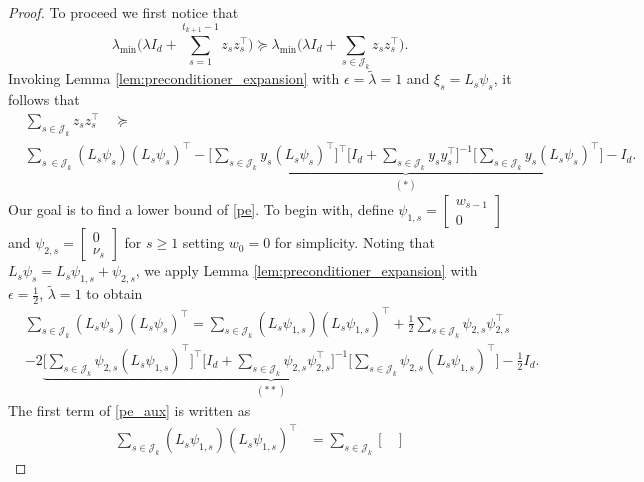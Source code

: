 \documentclass[11pt]{article}
\theoremstyle{plain}
\theoremstyle{definition}
\theoremstyle{remark}
\begin{document}
\begin{proof}
To proceed we first notice that
\[
{\lambda_{\min}} \bigg(\lambda I_d+ \sum_{s=1}^{t_{k+1}-1} z_s z_s^\top\bigg) \succeq    {\lambda_{\min}} \bigg(\lambda I_d+\sum_{s \in\mathcal{J}_k} z_s z_s^\top\bigg).
\]
Invoking Lemma \ref{lem:preconditioner_expansion} with $\epsilon=\tilde\lambda=1$ and $\xi_s=L_s \psi_s$, it follows that
\begin{equation}\label{pe}
\begin{split}
&\sum_{s \in\mathcal{J}_k} z_s z_s^{\top}\quad\succeq\\
& \sum_{s\ \in\mathcal{J}_k}  (L_s\psi_s)(L_s\psi_s)^{\top} - \underbrace{\bigg[\sum_{s \in\mathcal{J}_k}  y_s (L_s \psi_s)^{\top}\bigg]^{\top}\bigg [ I_d+\sum_{s \in\mathcal{J}_k} y_sy_s^{\top}\bigg ]^{-1} \bigg [\sum_{s \in\mathcal{J}_k}  y_s (L_s \psi_s)^{\top}\bigg ]}_{(*)} -  I_d.
\end{split}
\end{equation}
Our goal is to find a lower bound of \eqref{pe}. To begin with, define $
\psi_{1,s} = 
\begin{bmatrix}
    w_{s-1}\\
    0
\end{bmatrix}$ and $
\psi_{2,s} = 
\begin{bmatrix}
    0\\
    \nu_{s}
\end{bmatrix}$ for $s\geq 1$ setting $w_0=0$ for simplicity. Noting that $L_s\psi_s = L_s\psi_{1,s} + \psi_{2,s}$, we apply Lemma \ref{lem:preconditioner_expansion} with $\epsilon=\frac{1}{2}$, $\tilde\lambda=1$ to obtain
\begin{equation}\label{pe_aux}
\begin{split}
    &\sum_{s \in\mathcal{J}_k}  (L_s\psi_{s})(L_s\psi_{s})^{\top}
    =\sum_{s \in\mathcal{J}_k}  (L_s\psi_{1,s})(L_s\psi_{1,s})^{\top} + \frac{1}{2}\sum_{s \in\mathcal{J}_k} \psi_{2,s}\psi_{2,s}^{\top}\\
    & - 2\underbrace{\bigg [\sum_{s \in\mathcal{J}_k}  \psi_{2,s} (L_s \psi_{1,s})^{\top}\bigg]^{\top}\bigg[ I_d+\sum_{s \in\mathcal{J}_k} \psi_{2,s}\psi_{2,s}^{\top}\bigg]^{-1}\bigg[\sum_{s \in\mathcal{J}_k}  \psi_{2,s} (L_s \psi_{1,s})^{\top}\bigg]}_{(**)} - \frac{1}{2} I_d.
\end{split}
\end{equation}
The first term of \eqref{pe_aux} is written as
\begin{align*}
    \sum_{s \in\mathcal{J}_k}  (L_s\psi_{1,s})(L_s\psi_{1,s})^{\top} & = \sum_{s \in\mathcal{J}_k}
    \begin{bmatrix}

\end{bmatrix}
\end{align*}
\end{proof}
\end{document}
